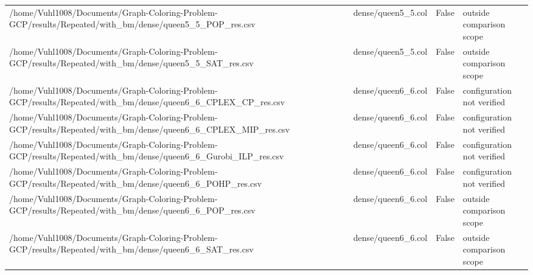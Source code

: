 \begin{table}[htbp]
\begin{tabular}{llll}
/home/Vuhl1008/Documents/Graph-Coloring-Problem-GCP/results/Repeated/with\_bm/dense/queen5\_5\_POP\_res.csv & dense/queen5\_5.col & False & outside comparison scope \\
/home/Vuhl1008/Documents/Graph-Coloring-Problem-GCP/results/Repeated/with\_bm/dense/queen5\_5\_SAT\_res.csv & dense/queen5\_5.col & False & outside comparison scope \\
/home/Vuhl1008/Documents/Graph-Coloring-Problem-GCP/results/Repeated/with\_bm/dense/queen6\_6\_CPLEX\_CP\_res.csv & dense/queen6\_6.col & False & configuration not verified \\
/home/Vuhl1008/Documents/Graph-Coloring-Problem-GCP/results/Repeated/with\_bm/dense/queen6\_6\_CPLEX\_MIP\_res.csv & dense/queen6\_6.col & False & configuration not verified \\
/home/Vuhl1008/Documents/Graph-Coloring-Problem-GCP/results/Repeated/with\_bm/dense/queen6\_6\_Gurobi\_ILP\_res.csv & dense/queen6\_6.col & False & configuration not verified \\
/home/Vuhl1008/Documents/Graph-Coloring-Problem-GCP/results/Repeated/with\_bm/dense/queen6\_6\_POHP\_res.csv & dense/queen6\_6.col & False & configuration not verified \\
/home/Vuhl1008/Documents/Graph-Coloring-Problem-GCP/results/Repeated/with\_bm/dense/queen6\_6\_POP\_res.csv & dense/queen6\_6.col & False & outside comparison scope \\
/home/Vuhl1008/Documents/Graph-Coloring-Problem-GCP/results/Repeated/with\_bm/dense/queen6\_6\_SAT\_res.csv & dense/queen6\_6.col & False & outside comparison scope \\
\hline
\end{tabular}
\end{table}

